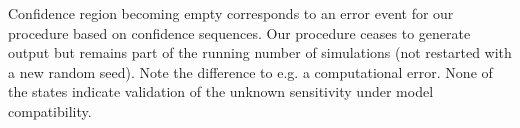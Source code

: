 Confidence region becoming empty corresponds to an error event for our procedure based on confidence sequences. Our procedure ceases to generate output but remains part of the running number of simulations (not restarted with a new random seed). Note the difference to e.g. a computational error. None of the states indicate validation of the unknown sensitivity under model compatibility.
